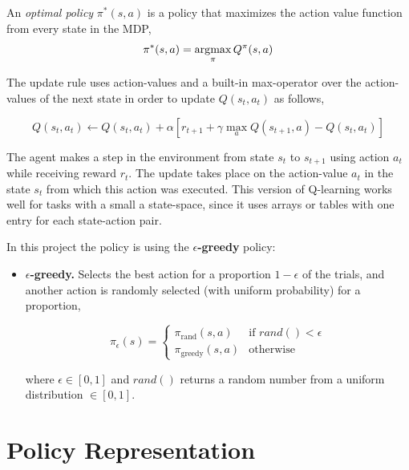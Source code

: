 An \emph{optimal policy} $\pi^*(s,a)$ is a policy that maximizes the action value function from every state in the MDP,
%
\begin{equation}
    \pi^*(s,a) = \operatorname*{\arg\!\max}_\pi Q^\pi(s, a)
\end{equation}

The update rule uses action-values and a built-in max-operator over the action-values of the next state in order to update $Q(s_t, a_t)$ as follows,

\begin{equation}
Q(s_t,a_t) \gets Q(s_t,a_t) + \alpha \left[r_{t+1} + \gamma \max_a Q(s_{t+1},a) - Q(s_t,a_t)\right]
\end{equation}

The agent makes a step in the environment from state $s_t$ to $s_{t+1}$ using action $a_t$ while receiving reward $r_t$. The update takes place on the action-value $a_t$ in the state $s_t$ from which this action was executed. This version of Q-learning works well for tasks with a small a state-space, since it uses arrays or tables with one entry for each state-action pair.

In this project the policy is using the \textbf{$\epsilon$-greedy} policy:

\begin{itemize}

    \item \textbf{$\epsilon$-greedy.} Selects the best action for a proportion
        $1 - \epsilon$ of the trials, and another action is randomly selected (with
        uniform probability) for a proportion,
        
        \begin{equation}
            \pi_{\epsilon}(s) = \left\{
             \begin{array}{lr}
                 \pi_{\textrm{rand}}(s,a) & \text{if } rand() < \epsilon\\
                 \pi_{\textrm{greedy}}(s,a) & \text{otherwise}
             \end{array}
           \right.
        \end{equation}

        where $\epsilon \in [0, 1]$ and $rand()$ returns a random number from a uniform distribution $\in [0, 1]$.

\end{itemize}

\section{Policy Representation}


